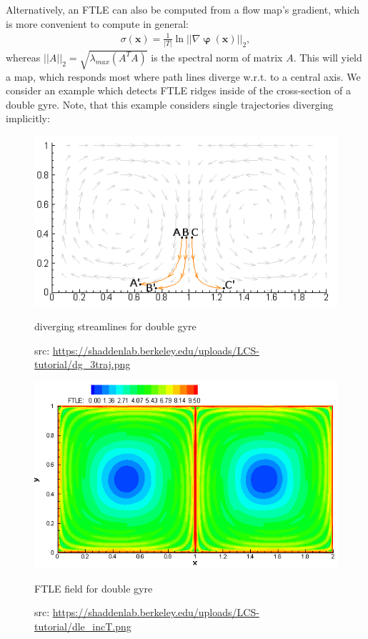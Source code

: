 \documentclass{scrartcl}
\begin{document}
Alternatively, an FTLE can also be computed from a flow map's gradient, which is more convenient to compute in general:
\begin{align*}
	\sigma(\mathbf{x})=\frac{1}{\lvert T\rvert}\ln \lvert\lvert\nabla\mathbf{\upvarphi(x)}\rvert\rvert _2,
\end{align*}
whereas $\lvert\lvert A\rvert\rvert _2 = \sqrt{\lambda_{max}(A^TA)}$ is the spectral norm of matrix $A$. This will yield a map, which responds most where path lines diverge w.r.t. to a central axis. We consider an example which detects FTLE ridges inside of the cross-section of a double gyre. Note, that this example considers single trajectories diverging implicitly:
\begin{figure}[!t]
\hskip 22pt
  \begin{minipage}[!t]{0.4\textwidth}
    \includegraphics[width=\textwidth]{img/diverge.png}
   \caption{diverging streamlines for double gyre}
   \label{diverge}
   \caption*{src: \url{https://shaddenlab.berkeley.edu/uploads/LCS-tutorial/dg_3traj.png}}
  \end{minipage} \hskip 40pt
  \begin{minipage}[!t]{0.4\textwidth}
    \includegraphics[width=\textwidth]{img/ftle_gyre.png}
    \caption{FTLE field for double gyre}
    \label{ftle_gyre}
   \caption*{src: \url{https://shaddenlab.berkeley.edu/uploads/LCS-tutorial/dle_incT.png}}
  \end{minipage}
\end{figure}
\end{document}
